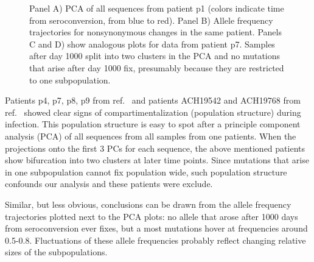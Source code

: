 \documentclass[rmp]{revtex4}
\begin{document}
\begin{figure}[ht]
\begin{center}
\caption{Panel A) PCA of all sequences from patient p1 (colors indicate time from seroconversion,
from blue to red). Panel B) Allele frequency trajectories for nonsynonymous
changes in the same patient. Panels C and D) show analogous plots for data from
patient p7. Samples after day 1000 split into two clusters in the PCA and no
mutations that arise after day 1000 fix, presumably because they are restricted
to one subpopulation. }
\label{fig:aftp}
\end{center}
\end{figure}
Patients p4, p7, p8, p9 from ref.~\citealp{shankarappa_consistent_1999} and
patients ACH19542 and ACH19768 from ref.~\citealp{bunnik_autologous_2008} showed clear signs of
compartimentalization (population structure) during infection. This population
structure is easy to spot after a principle component analysis (PCA) of all
sequences from all samples from one patients. When the projections onto the
first 3 PCs for each sequence, the above mentioned patients show bifurcation
into two clusters at later time points. Since mutations that arise in one subpopulation cannot fix population wide, such population
structure confounds our analysis and these patients were exclude.


Similar, but less obvious, conclusions can be drawn from the allele frequency
trajectories plotted next to the PCA plots: no allele that arose after 1000
days from seroconversion ever fixes, but a most mutations hover at frequencies
around 0.5-0.8. Fluctuations of these allele frequencies probably reflect
changing relative sizes of the subpopulations. 

\end{document}
